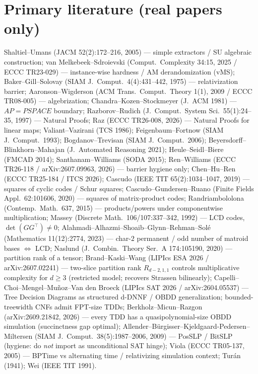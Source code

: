\documentclass[11pt]{article}
\begin{document}
\section*{Primary literature (real papers only)}
Shaltiel--Umans (JACM 52(2):172--216, 2005) --- simple extractors / SU algebraic
construction;
van Melkebeek--Sdroievski (Comput.\ Complexity 34:15, 2025 / ECCC TR23-029) ---
instance-wise hardness / AM derandomization (vMS);
Baker--Gill--Solovay (SIAM J.\ Comput.\ 4(4):431--442, 1975) --- relativization
barrier;
Aaronson--Wigderson (ACM Trans.\ Comput.\ Theory 1(1), 2009 / ECCC TR08-005) ---
algebrization;
Chandra--Kozen--Stockmeyer (J.\ ACM 1981) --- $AP=PSPACE$ boundary;
Razborov--Rudich (J.\ Comput.\ System Sci.\ 55(1):24--35, 1997) --- Natural Proofs;
Raz (ECCC TR26-008, 2026) --- Natural Proofs for linear maps;
Valiant--Vazirani (TCS 1986); Feigenbaum--Fortnow (SIAM J.\ Comput.\ 1993);
Bogdanov--Trevisan (SIAM J.\ Comput.\ 2006);
Beyersdorff--Blinkhorn--Mahajan (J.\ Automated Reasoning 2021);
Heule--Seidl--Biere (FMCAD 2014); Santhanam--Williams (SODA 2015);
Ren--Williams (ECCC TR26-118 / arXiv:2607.09963, 2026) --- barrier hygiene only;
Chen--Hu--Ren (ECCC TR25-184 / ITCS 2026);
Cascudo (IEEE TIT 65(2):1034--1047, 2019) --- squares of cyclic codes / Schur squares;
Cascudo--Gundersen--Ruano (Finite Fields Appl.\ 62:101606, 2020) --- squares of
matrix-product codes;
Randriambololona (Contemp.\ Math.\ 637, 2015) --- products/powers under
componentwise multiplication;
Massey (Discrete Math.\ 106/107:337--342, 1992) --- LCD codes,
$\det(GG^\top)\neq 0$;
Alahmadi--Alhazmi--Shoaib--Glynn--Rehman--Sol\'e (Mathematics 11(12):2774, 2023)
--- char-$2$ permanent / odd number of matroid bases $\Leftrightarrow$ LCD;
Naslund (J.\ Combin.\ Theory Ser.\ A 174:105190, 2020) --- partition rank of a
tensor;
Brand--Kaski--Wang (LIPIcs ESA 2026 / arXiv:2607.02241) --- two-slice partition
rank $R_{d-2,1,1}$ controls multiplicative complexity for $d\ge 3$ (restricted
model; recovers Strassen bilinearly);
Capelli--Choi--Mengel--Mu\~noz--Van den Broeck (LIPIcs SAT 2026 /
arXiv:2604.05537) --- Tree Decision Diagrams as structured d-DNNF / OBDD
generalization; bounded-treewidth CNFs admit FPT-size TDDs;
Berkholz--Micun--Razgon (arXiv:2609.21842, 2026) --- every TDD has a
quasipolynomial-size OBDD simulation (succinctness gap optimal);
Allender--B\"urgisser--Kjeldgaard-Pedersen--Miltersen (SIAM J.\ Comput.\
38(5):1987--2006, 2009) --- PosSLP / BitSLP (hygiene: do \emph{not} import as
unconditional SAT hinge);
Viola (ECCC TR05-137, 2005) --- BPTime vs alternating time / relativizing
simulation context;
Tur\'an (1941); Wei (IEEE TIT 1991).
\end{document}
